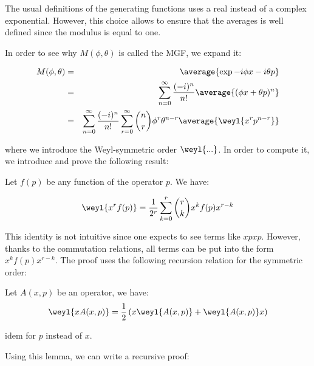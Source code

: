 \begin{remark}
    The usual definitions of the generating functions uses a real instead of a complex exponential. However, this choice allows to ensure that the averages is well defined since the modulus is equal to one.
\end{remark}

In order to see why $M(\phi, \theta)$ is called the MGF, we expand it:

\begin{eqnarray}
    M(\phi, \theta) &=& \average{\exp{-i \phi x -i \theta p}} \nonumber\\
    &=& \sum_{n = 0}^\infty \frac{(-i)^n}{n!} \average{(\phi x + \theta p)^n} \nonumber\\
    &=& \sum_{n = 0}^\infty \frac{(-i)^n}{n!} \sum_{r = 0}^\infty \binom{n}{r} \phi^r \theta^{n - r} \average{\weyl{x^r p^{n - r}}}
\end{eqnarray}

where we introduce the Weyl-symmetric order $\weyl{...}$. In order to compute it, we introduce and prove the following result:

\begin{theorem}
    Let $f(p)$ be any function of the operator $p$. We have:
    
    \begin{equation}
        \weyl{x^r f(p)} = \frac{1}{2^r} \sum_{k = 0}^r \binom{r}{k} x^k f(p) x^{r - k}
    \end{equation}
\end{theorem}

This identity is not intuitive since one expects to see terms like $x p x p$. However, thanks to the commutation relations, all terms can be put into the form $x^k f(p) x^{r - k}$. The proof uses the following recursion relation for the symmetric order:

\begin{lemma}
    Let $A(x, p)$ be an operator, we have:
    \begin{equation}
        \weyl{x A(x, p)} = \frac{1}{2} \left(x \weyl{A(x, p)} + \weyl{A(x, p)} x\right)
    \end{equation}

    idem for $p$ instead of $x$.
\end{lemma}

Using this lemma, we can write a recursive proof:

